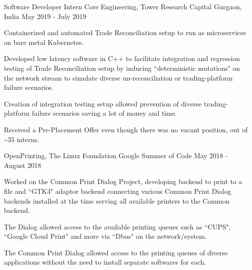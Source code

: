 \begin{cventries}
  \cventry
    {Software Developer Intern} %
    {Core Engineering, Tower Research Capital} %
    {Gurgaon, India} %
    {May 2019 - July 2019} %
    {
      \begin{cvitems} %
        \item {Containerized and automated Trade Reconciliation setup to run as microservices on bare metal Kubernetes.}
        \item {Developed low latency software in C++ to facilitate integration and regression testing of Trade Reconciliation setup by inducing ``deterministic mutations" on the network stream to simulate diverse un-reconciliation or trading-platform failure scenarios.}
        \item {Creation of integration testing setup allowed prevention of diverse trading-platform failure scenarios saving a lot of money and time.}
        \item {Received a Pre-Placement Offer even though there was no vacant position, out of \textasciitilde 35 interns.}
      \end{cvitems}
    }


  \cventry
    {OpenPrinting, The Linux Foundation} %
    {Google Summer of Code} %
    {} %
    {May 2018 - August 2018} %
    {
      \begin{cvitems} %
        \item {Worked on the Common Print Dialog Project, developing backend to print to a file and ``GTK3" adaptor backend connecting various Common Print Dialog backends installed at the time serving all available printers to the Common backend.}
        \item {The Dialog allowed access to the available printing queues such as ``CUPS", ``Google Cloud Print" and more via ``Dbus" on the network/system.}
        \item {The Common Print Dialog allowed access to the printing queues of diverse applications without the need to install separate softwares for each.}
      \end{cvitems}
    }


\end{cventries}
